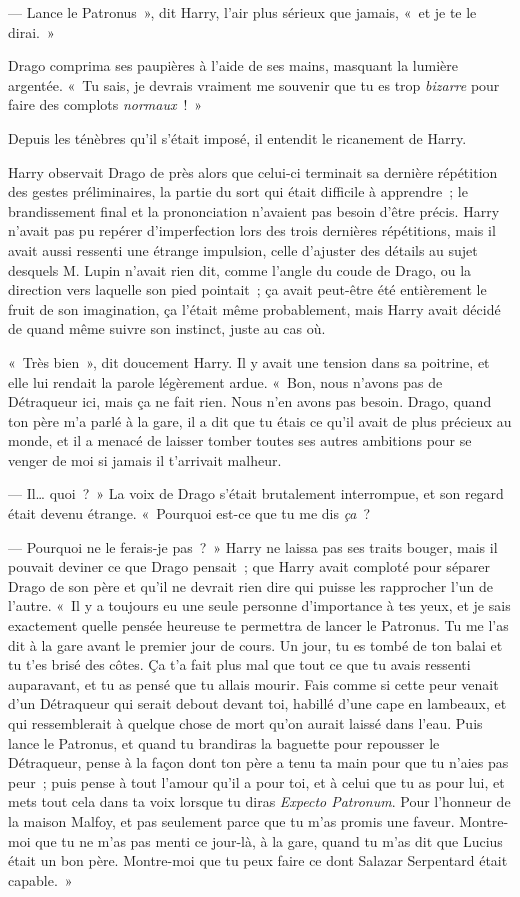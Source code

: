 --- Lance le Patronus~», dit Harry, l'air plus sérieux que jamais, «~et je te le dirai.~»

Drago comprima ses paupières à l'aide de ses mains, masquant la lumière argentée. «~Tu sais, je devrais vraiment me souvenir que tu es trop \emph{bizarre} pour faire des complots \emph{normaux}~!~»

Depuis les ténèbres qu'il s'était imposé, il entendit le ricanement de Harry.

\later

Harry observait Drago de près alors que celui-ci terminait sa dernière répétition des gestes préliminaires, la partie du sort qui était difficile à apprendre~; le brandissement final et la prononciation n'avaient pas besoin d'être précis. Harry n'avait pas pu repérer d'imperfection lors des trois dernières répétitions, mais il avait aussi ressenti une étrange impulsion, celle d'ajuster des détails au sujet desquels M. Lupin n'avait rien dit, comme l'angle du coude de Drago, ou la direction vers laquelle son pied pointait~; ça avait peut-être été entièrement le fruit de son imagination, ça l'était même probablement, mais Harry avait décidé de quand même suivre son instinct, juste au cas où.

«~Très bien~», dit doucement Harry. Il y avait une tension dans sa poitrine, et elle lui rendait la parole légèrement ardue. «~Bon, nous n'avons pas de Détraqueur ici, mais ça ne fait rien. Nous n'en avons pas besoin. Drago, quand ton père m'a parlé à la gare, il a dit que tu étais ce qu'il avait de plus précieux au monde, et il a menacé de laisser tomber toutes ses autres ambitions pour se venger de moi si jamais il t'arrivait malheur.

--- Il… quoi~?~» La voix de Drago s'était brutalement interrompue, et son regard était devenu étrange. «~Pourquoi est-ce que tu me dis \emph{ça}~?

--- Pourquoi ne le ferais-je pas~?~» Harry ne laissa pas ses traits bouger, mais il pouvait deviner ce que Drago pensait~; que Harry avait comploté pour séparer Drago de son père et qu'il ne devrait rien dire qui puisse les rapprocher l'un de l'autre. «~Il y a toujours eu une seule personne d'importance à tes yeux, et je sais exactement quelle pensée heureuse te permettra de lancer le Patronus. Tu me l'as dit à la gare avant le premier jour de cours. Un jour, tu es tombé de ton balai et tu t'es brisé des côtes. Ça t'a fait plus mal que tout ce que tu avais ressenti auparavant, et tu as pensé que tu allais mourir. Fais comme si cette peur venait d'un Détraqueur qui serait debout devant toi, habillé d'une cape en lambeaux, et qui ressemblerait à quelque chose de mort qu'on aurait laissé dans l'eau. Puis lance le Patronus, et quand tu brandiras la baguette pour repousser le Détraqueur, pense à la façon dont ton père a tenu ta main pour que tu n'aies pas peur~; puis pense à tout l'amour qu'il a pour toi, et à celui que tu as pour lui, et mets tout cela dans ta voix lorsque tu diras \emph{Expecto Patronum}. Pour l'honneur de la maison Malfoy, et pas seulement parce que tu m'as promis une faveur. Montre-moi que tu ne m'as pas menti ce jour-là, à la gare, quand tu m'as dit que Lucius était un bon père. Montre-moi que tu peux faire ce dont Salazar Serpentard était capable.~»


